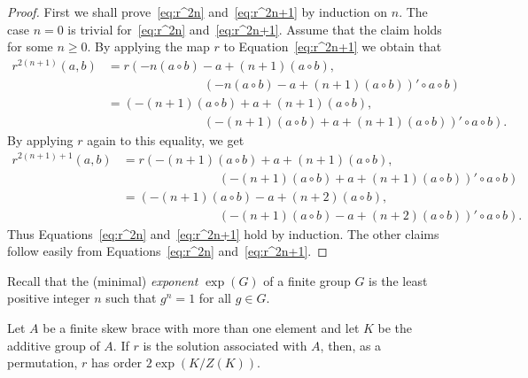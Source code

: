 \begin{proof} 
First we shall prove~\eqref{eq:r^2n} and~\eqref{eq:r^2n+1} by induction on $n$. The case $n=0$ is trivial for~\eqref{eq:r^2n}
  and~\eqref{eq:r^2n+1}. Assume that the claim holds for some $n\geq 0$. By applying the map $r$ to Equation~\eqref{eq:r^2n+1} 
  we obtain that 
  \begin{align*} 
  r^{2(n+1)}(a,b) &=r\left( -n(a\circ b)-a+(n+1)(a\circ b),\right.\\
    &\phantom{=(-n(a\circ b)+} \left. (-n(a\circ b)-a+(n+1)(a\circ
    b))'\circ a\circ b\right)\\
    &=\left( -(n+1)(a\circ b)+a+(n+1)(a\circ b),\right.\\
    &\phantom{=(-n(a\circ b)+} \left. (-(n+1)(a\circ b)+a+(n+1)(a\circ
    b))'\circ a\circ b\right).
    \end{align*} 
    By applying $r$ again to this equality, we get 
    \begin{align*} 
  r^{2(n+1)+1}(a,b) &= r\left(-(n+1)(a\circ b)+a+(n+1)(a\circ
    b),\right.\\
    &\phantom{=(-n(a\circ b)+} \left. (-(n+1)(a\circ b)+a+(n+1)(a\circ b))'\circ a\circ b\right)\\
    &=\left( -(n+1)(a\circ b)-a+(n+2)(a\circ b),\right.\\
    &\phantom{=(-n(a\circ b)+} \left. (-(n+1)(a\circ b)-a+(n+2)(a\circ
    b))'\circ a\circ b\right).
    \end{align*} 
   Thus Equations~\eqref{eq:r^2n} and~\eqref{eq:r^2n+1} hold by induction.  The other claims follow easily from
    Equations~\eqref{eq:r^2n} and~\eqref{eq:r^2n+1}.
\end{proof}

%

Recall that the (minimal) \emph{exponent} $\exp(G)$ of a 
finite group $G$ is the least positive integer $n$ such that 
$g^n=1$ for all $g\in G$. 

\begin{theorem} 
\label{thm:|r|} 
  Let $A$ be a finite skew brace with more than one
  element and let $K$ be the additive group of $A$. 
  If $r$ is the solution associated with $A$, 
  then, as a permutation, $r$ has order $2\exp(K/Z(K))$.
\end{theorem}

